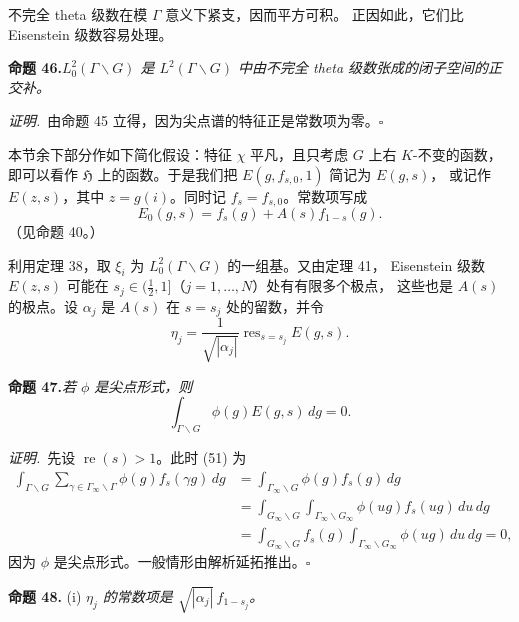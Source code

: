 不完全 theta 级数在模 $\Gamma$ 意义下紧支，因而平方可积。
正因如此，它们比 Eisenstein 级数容易处理。

\par\medskip\noindent\textbf{命题 46.}\quad\emph{$L_{0}^{2}(\Gamma\backslash G)$ 是
$L^{2}(\Gamma\backslash G)$ 中由不完全 theta 级数张成的闭子空间的正交补。}

\smallskip
\noindent\emph{证明.}\ 由命题 45 立得，因为尖点谱的特征正是常数项为零。\hfill$\square$

本节余下部分作如下简化假设：特征 $\chi$ 平凡，且只考虑 $G$ 上右 $K$-不变的函数，
即可以看作 $\mathfrak{H}$ 上的函数。于是我们把 $E(g,f_{s,0},1)$ 简记为 $E(g,s)$，
或记作 $E(z,s)$，其中 $z=g(i)$。同时记 $f_{s}=f_{s,0}$。常数项写成
\begin{equation}\tag{49}
E_{0}(g,s)=f_{s}(g)+A(s)f_{1-s}(g).
\end{equation}
（见命题 40。）

利用定理 38，取 $\xi_{i}$ 为 $L_{0}^{2}(\Gamma\backslash G)$ 的一组基。又由定理 41，
Eisenstein 级数 $E(z,s)$ 可能在 $s_{j}\in(\tfrac12,1]$（$j=1,\dots,N$）处有有限多个极点，
这些也是 $A(s)$ 的极点。设 $\alpha_{j}$ 是 $A(s)$ 在 $s=s_{j}$ 处的留数，并令
\begin{equation}\tag{50}
\eta_{j}=\frac{1}{\sqrt{|\alpha_{j}|}}\operatorname{res}_{s=s_{j}}E(g,s).
\end{equation}

\par\medskip\noindent\textbf{命题 47.}\quad\emph{若 $\phi$ 是尖点形式，则}
\begin{equation}\tag{51}
\int_{\Gamma\backslash G}\phi(g)E(g,s)\,dg=0 .
\end{equation}

\smallskip
\noindent\emph{证明.}\ 先设 $\operatorname{re}(s)>1$。此时 (51) 为
\[
\begin{aligned}
\int_{\Gamma\backslash G}\sum_{\gamma\in\Gamma_{\infty}\backslash\Gamma}
\phi(g)f_{s}(\gamma g)\,dg
&=\int_{\Gamma_{\infty}\backslash G}\phi(g)f_{s}(g)\,dg\\
&=\int_{G_{\infty}\backslash G}\int_{\Gamma_{\infty}\backslash G_{\infty}}
\phi(ug)f_{s}(ug)\,du\,dg\\
&=\int_{G_{\infty}\backslash G}f_{s}(g)\int_{\Gamma_{\infty}\backslash G_{\infty}}
\phi(ug)\,du\,dg=0,
\end{aligned}
\]
因为 $\phi$ 是尖点形式。一般情形由解析延拓推出。\hfill$\square$

\par\medskip\noindent\textbf{命题 48.}\quad
(i) \emph{$\eta_{j}$ 的常数项是 $\sqrt{|\alpha_{j}|}\,f_{1-s_{j}}$。}

